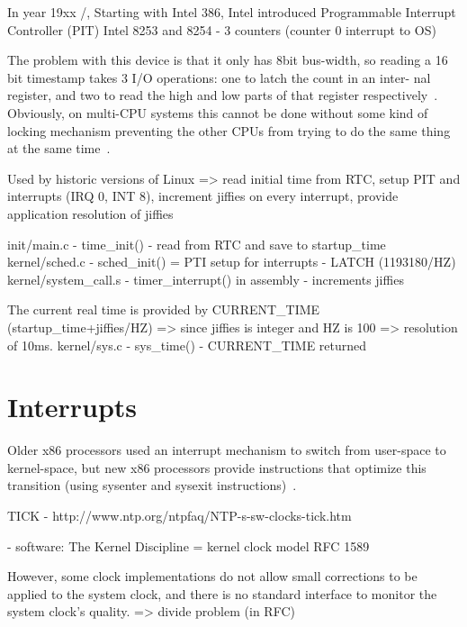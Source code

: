 In year 19xx /, Starting with Intel 386,
Intel introduced
Programmable Interrupt Controller (PIT) Intel 8253 and 8254 - 3 counters (counter 0 interrupt to OS)

The problem with this device is that it only has
8bit bus-width, so reading a 16 bit timestamp takes
3 I/O operations: one to latch the count in an inter-
nal register, and two to read the high and low parts
of that register respectively~\cite{timecounters}.
Obviously, on multi-CPU systems this cannot be
done without some kind of locking mechanism
preventing the other CPUs from trying to do the
same thing at the same time~\cite{timecounters}.


Used by historic versions of Linux
=> read initial time from RTC, setup PIT and interrupts (IRQ 0, INT 8), increment jiffies on every interrupt, provide application resolution of jiffies

init/main.c - time\_init() - read from RTC and save to startup\_time
kernel/sched.c - sched\_init() = PTI setup for interrupts - LATCH (1193180/HZ)
kernel/system\_call.s - timer\_interrupt() in assembly - increments jiffies

The current real time is provided by CURRENT\_TIME (startup\_time+jiffies/HZ) => since jiffies is integer and HZ is 100 => resolution of 10ms.
kernel/sys.c - sys\_time() - CURRENT\_TIME returned


\section{Interrupts}
Older x86 processors used an interrupt mechanism to switch from
user-space to kernel-space, but new x86 processors provide instructions
that optimize this transition (using sysenter and sysexit instructions)~\cite{ibm-linux-system-calls}.


TICK - http://www.ntp.org/ntpfaq/NTP-s-sw-clocks-tick.htm


- software:
The Kernel Discipline =  kernel clock model RFC 1589

However, some clock implementations do not allow small corrections to be applied to the system clock, and there is no standard interface to monitor the system clock's quality.
=> divide problem (in RFC)
